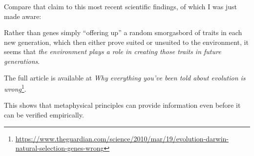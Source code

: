 \begin{footnotesize}
\begin{sffamily}
\begin{quotex}
\end{quotex}
Compare that claim to this most recent scientific findings, of which I was just made aware:

\begin{quotex}
Rather than genes simply “offering up” a random smorgasbord of traits in each new generation, which then either prove
suited or unsuited to the environment, it seems that \emph{the environment plays a role in creating those traits in
future generations}. 

\end{quotex}
The full article is available at \textit{Why everything you've been told about evolution is wrong}\footnote{\url{https://www.theguardian.com/science/2010/mar/19/evolution-darwin-natural-selection-genes-wrong}}.

This shows that metaphysical principles can provide information even before it can be verified empirically.

\end{sffamily}\end{footnotesize}
